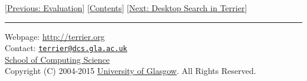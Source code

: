 {[}\href{evaluation.html}{Previous: Evaluation}{]}
{[}\href{index.html}{Contents}{]} {[}\href{terrier_desktop.html}{Next:
Desktop Search in Terrier}{]}

\begin{center}\rule{0.5\linewidth}{\linethickness}\end{center}

Webpage: \url{http://terrier.org}\\
Contact:
\href{mailto:terrier@dcs.gla.ac.uk}{\nolinkurl{terrier@dcs.gla.ac.uk}}\\
\href{http://www.dcs.gla.ac.uk/}{School of Computing Science}\\
Copyright (C) 2004-2015 \href{http://www.gla.ac.uk/}{University of
Glasgow}. All Rights Reserved.

~
